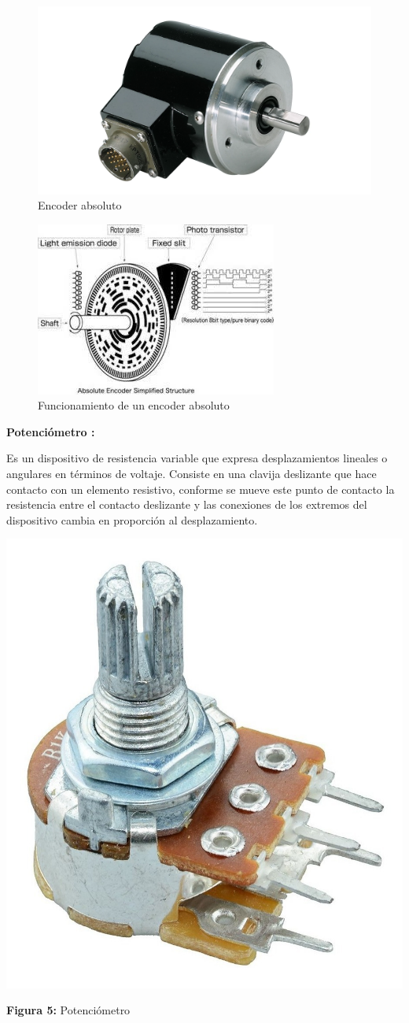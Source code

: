 \begin{figure}[h]
	\centering
	\includegraphics[width=0.4\linewidth, height=0.2\textwidth]{img/encoder}
	\caption{Encoder absoluto}
	\label{fig:encoder}
\end{figure} 

\begin{figure}[h]
	\centering
	\includegraphics[width=0.4\linewidth]{img/Sencoderabsoluto}
	\caption{Funcionamiento de un encoder absoluto}
	\label{fig:Sencoderabsoluto}
\end{figure}

\vspace{10mm} 
\textbf{Potenciómetro :} 

Es un dispositivo de resistencia variable que expresa desplazamientos lineales o angulares en términos de voltaje. Consiste en una clavija deslizante que hace contacto con un elemento resistivo, conforme se mueve este punto de contacto la resistencia entre el contacto deslizante y las conexiones de los extremos del dispositivo cambia en proporción al desplazamiento.


\vspace{5mm}

\begin{center}
	\includegraphics[width=0.3\linewidth]{img/potenciometro}
	
	\vspace{2mm} %
	
	\textbf{Figura 5:} Potenciómetro
\end{center}

